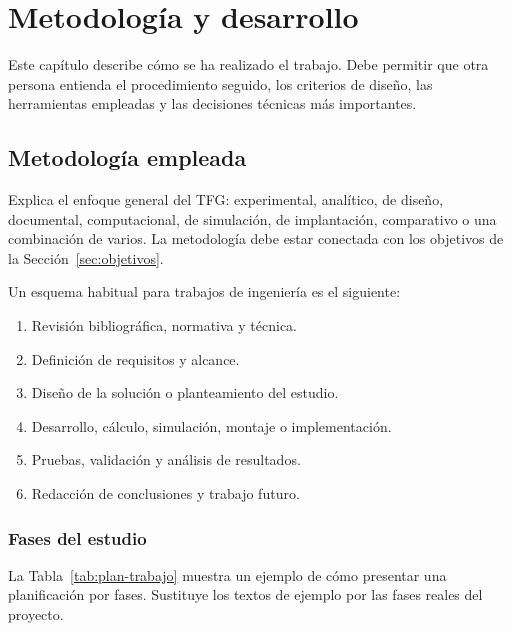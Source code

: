 \chapter{Metodología y desarrollo}
\label{cap:metodologia}

Este capítulo describe cómo se ha realizado el trabajo. Debe permitir que otra
persona entienda el procedimiento seguido, los criterios de diseño, las
herramientas empleadas y las decisiones técnicas más importantes.

\section{Metodología empleada}
\label{sec:metodologia-empleada}

Explica el enfoque general del TFG: experimental, analítico, de diseño,
documental, computacional, de simulación, de implantación, comparativo o una
combinación de varios. La metodología debe estar conectada con los objetivos de
la Sección~\ref{sec:objetivos}.

Un esquema habitual para trabajos de ingeniería es el siguiente:

\begin{enumerate}
    \item Revisión bibliográfica, normativa y técnica.
    \item Definición de requisitos y alcance.
    \item Diseño de la solución o planteamiento del estudio.
    \item Desarrollo, cálculo, simulación, montaje o implementación.
    \item Pruebas, validación y análisis de resultados.
    \item Redacción de conclusiones y trabajo futuro.
\end{enumerate}

\subsection{Fases del estudio}
\label{subsec:fases-estudio}

La Tabla~\ref{tab:plan-trabajo} muestra un ejemplo de cómo presentar una
planificación por fases. Sustituye los textos de ejemplo por las fases reales
del proyecto.

